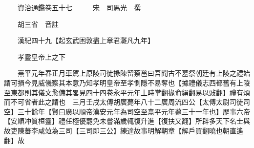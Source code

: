 










 


 
 


 

  
  
  
  
  





  
  
  
  
  
 
  

  

  
  
  



  

 
 

  
   




  

  
  


  　　資治通鑑卷五十七　　　宋　司馬光　撰

　　胡三省　音註

　　漢紀四十九【起玄武困敦盡上章君灘凡九年】

　　孝靈皇帝上之下

　　熹平元年春正月車駕上原陵司徒掾陳留蔡邕曰吾聞古不墓祭朝廷有上陵之禮始謂可損今見威儀察其本意乃知孝明皇帝至孝惻隱不易奪也【據禮儀志西都舊有上陵至東都則其儀文愈備其畧見四十四卷永平元年丄時掌翻掾俞絹翻易以䜴翻】禮有煩而不可省者此之謂也　三月壬戌太傅胡廣薨年八十二廣周流四公【太傅太尉司徒司空】三十餘年【賢曰廣以順帝漢安元年為司空至熹平元年薨三十一年也】歷事六帝【安順冲質桓靈】禮任極優罷免未嘗滿歲輒復升進【復扶又翻】所辟多天下名士與故吏陳蕃李咸竝為三司【三司即三公】練達故事明解朝章【解戶買翻曉也朝直遙翻】故

